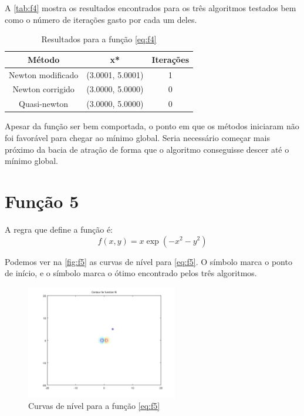 \documentclass[12pt]{article}
\begin{document}
A \autoref{tab:f4} mostra os resultados encontrados para os três algoritmos testados bem como o número de iterações gasto por cada um deles.

\begin{table}[H]
\centering
\begin{tabular}{*3c}
\toprule
Método			&	x*		&	Iterações\\
\midrule
Newton modificado	&	(3.0001, 5.0001)	&	1\\
Newton corrigido	&	(3.0000, 5.0000)	&	0\\
Quasi-newton		&	(3.0000, 5.0000)	&	0\\
\bottomrule
\end{tabular}
\caption{\small{Resultados para a função \autoref{eq:f4} }}
\label{tab:f4}
\end{table}

Apesar da função ser bem comportada, o ponto em que os métodos iniciaram não foi favorável para chegar ao mínimo global. Seria necessário
começar mais próximo da bacia de atração de forma que o algoritmo conseguisse descer até o mínimo global.

\section{Função 5}
A regra que define a função é:
\begin{equation}
\label{eq:f5}
f(x, y) = x\exp(-x^2 -y^2)
\end{equation}

Podemos ver na \autoref{fig:f5} as curvas de nível para \autoref{eq:f5}. O símbolo \textit{\textopenbullet} marca o ponto de início,
e o símbolo \textit{\texttimes} marca o ótimo encontrado pelos três algoritmos.

\begin{figure}[H]
  \centering
  \includegraphics[width=250px]{../matlab/images/f5_contour}
  \caption{Curvas de nível para a função \autoref{eq:f5}}
  \label{fig:f5}
\end{figure}
\end{document}
